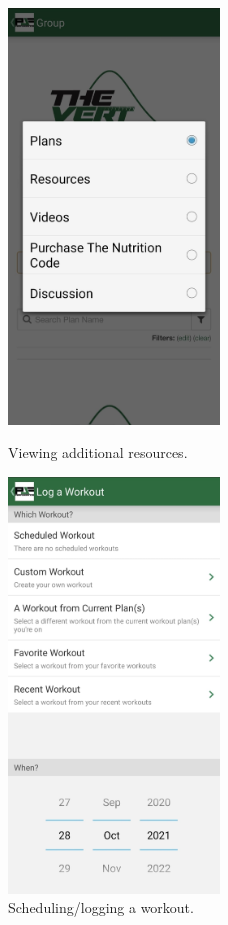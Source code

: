 \begin{figure}[H]
    \centering
    \begin{minipage}{0.5\textwidth}
        \centering
        \includegraphics[width=0.5\textwidth]{pjf/pjf-group-resources.jpeg}
        \caption{Viewing additional resources.}
        \label{fig:pjf-resources}
    \end{minipage}%
    \begin{minipage}{0.5\textwidth}
        \centering
        \includegraphics[width=0.5\textwidth]{pjf/pjf-logging-workout.jpeg}
        \caption{Scheduling/logging a workout.}
        \label{fig:pjf-workout}
    \end{minipage}%
\end{figure}
